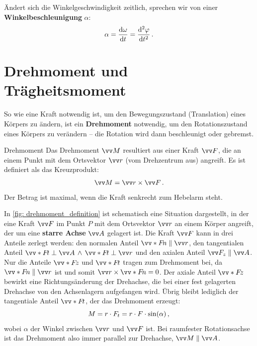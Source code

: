 Ändert sich die Winkelgeschwindigkeit zeitlich, sprechen wir von einer \textbf{Winkelbeschleunigung} $\alpha$:
\begin{equation}\label{eq: winkelbeschleunigung}
    \alpha = \frac{\mathrm{d}\omega}{\mathrm{d}t} = \frac{\mathrm{d}^2\varphi}{\mathrm{d}t^2} \,.
\end{equation}

\section{Drehmoment und Trägheitsmoment}\label{sec: drehmoment_traegheit}

So wie eine Kraft notwendig ist, um den Bewegungszustand (Translation) eines Körpers zu ändern, ist ein \textbf{Drehmoment} notwendig, um den Rotationszustand eines Körpers zu verändern -- die Rotation wird dann beschleunigt oder gebremst.

\begin{importantbox}{Drehmoment}
    Das Drehmoment $\ivec{M}$ resultiert aus einer Kraft $\ivec{F}$, die an einem Punkt mit dem Ortsvektor $\ivec{r}$ (vom Drehzentrum aus) angreift. Es ist definiert als das Kreuzprodukt:
    \begin{equation}\label{eq: drehmoment_def_M_r_cross_F}
        \ivec{M} = \ivec{r} \times \ivec{F} \mDot
    \end{equation}
    Der Betrag ist maximal, wenn die Kraft senkrecht zum Hebelarm steht.
\end{importantbox}
In \cref{fig: drehmoment_definition} ist schematisch eine Situation dargestellt, in der eine Kraft $\ivec{F}$ im Punkt $P$ mit dem Ortsvektor $\ivec{r}$ an einem Körper angreift, der um eine \textbf{starre Achse} $\ivec{A}$ gelagert ist. Die Kraft $\ivec{F}$ kann in drei Anteile zerlegt werden: den normalen Anteil $\ivecS{F}{n} \parallel \ivec{r}$, den tangentialen Anteil $\ivecS{F}{t} \perp \ivec{A} \, \wedge \, \ivecS{F}{t} \perp \ivec{r}$ und den axialen Anteil $\ivec{F}_z \parallel \ivec{A}$. Nur die Anteile $\ivecS{F}{z}$ und $\ivecS{F}{t}$ tragen zum Drehmoment bei, da $\ivecS{F}{n} \parallel \ivec{r}$ ist und somit $\ivec{r} \times \ivecS{F}{n} = 0$. 
Der axiale Anteil $\ivecS{F}{z}$ bewirkt eine Richtungsänderung der Drehachse, die bei einer fest gelagerten Drehachse von den Achsenlagern aufgefangen wird. Übrig bleibt lediglich der tangentiale Anteil $\ivecS{F}{t}$, der das Drehmoment erzeugt:
\begin{equation}\label{eq: drehmoment_betrag}
    M = r \cdot F_t = r \cdot F \cdot \sin(\alpha) \,{,}\,
\end{equation}
wobei $\alpha$ der Winkel zwischen $\ivec{r}$ und $\ivec{F}$ ist. Bei raumfester Rotationsachse ist das Drehmoment also immer parallel zur Drehachse, \gDh $\ivec{M} \parallel \ivec{A}$.

